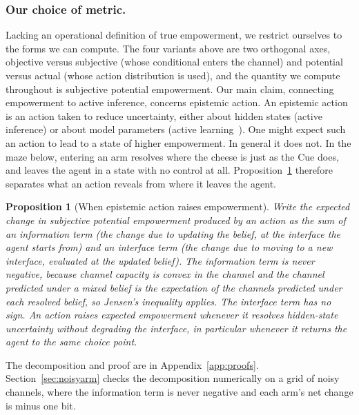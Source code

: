 \documentclass[pdflatex,sn-apa]{sn-jnl}%
\newtheorem{proposition}{Proposition}
\theoremstyle{definition}
\begin{document}
\subsubsection{Our choice of metric.}
Lacking an operational definition of true empowerment, we restrict ourselves to the forms we can compute. The four variants above are two orthogonal axes, objective versus subjective (whose conditional enters the channel) and potential versus actual (whose action distribution is used), and the quantity we compute throughout is subjective potential empowerment. Our main claim, connecting empowerment to active inference, concerns epistemic action. An epistemic action is an action taken to reduce uncertainty, either about hidden states (active inference) or about model parameters (active learning~\citep{schwartenbeck2019activelearning}). One might expect such an action to lead to a state of higher empowerment. In general it does not. In the maze below, entering an arm resolves where the cheese is just as the Cue does, and leaves the agent in a state with no control at all. Proposition~\ref{prop:epistemic} therefore separates what an action reveals from where it leaves the agent.

\begin{proposition}[When epistemic action raises empowerment]\label{prop:epistemic}
Write the expected change in subjective potential empowerment produced by an action as the sum of an information term (the change due to updating the belief, at the interface the agent starts from) and an interface term (the change due to moving to a new interface, evaluated at the updated belief). The information term is never negative, because channel capacity is convex in the channel and the channel predicted under a mixed belief is the expectation of the channels predicted under each resolved belief, so Jensen's inequality applies. The interface term has no sign. An action raises expected empowerment whenever it resolves hidden-state uncertainty without degrading the interface, in particular whenever it returns the agent to the same choice point.
\end{proposition}

The decomposition and proof are in Appendix~\ref{app:proofs}. Section~\ref{sec:noisyarm} checks the decomposition numerically on a grid of noisy channels, where the information term is never negative and each arm's net change is minus one bit.
\end{document}

